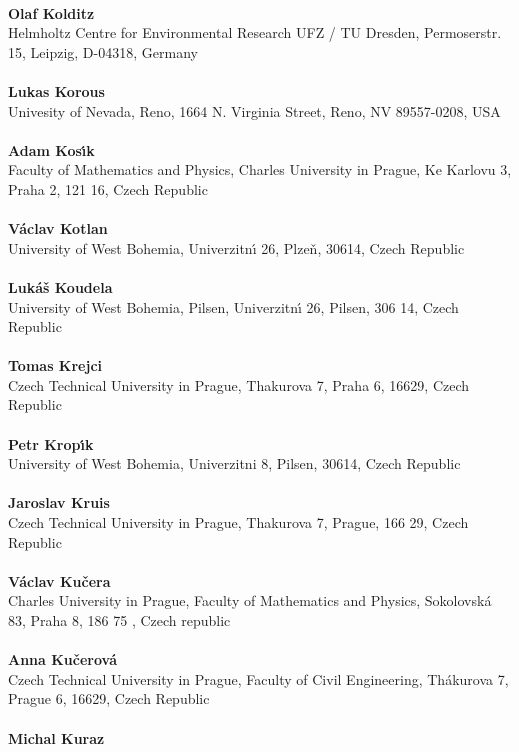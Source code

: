 \\ 
\textbf{Olaf Kolditz}
\\ 
Helmholtz Centre for Environmental Research UFZ / TU Dresden, Permoserstr. 15, Leipzig, D-04318, Germany\\ 
\\ 
\textbf{Lukas Korous}
\\ 
Univesity of Nevada, Reno, 1664 N. Virginia Street, Reno, NV 89557-0208, USA\\ 
\\ 
\textbf{Adam Kos\'{\i}k}
\\ 
Faculty of Mathematics and Physics, Charles University in Prague, Ke Karlovu 3, Praha 2, 121 16, Czech Republic\\ 
\\ 
\textbf{V\'aclav Kotlan}
\\ 
University of West Bohemia, Univerzitn\'{\i} 26, Plze\v{n}, 30614, Czech Republic\\ 
\\ 
\textbf{Luk\'aš Koudela}
\\ 
University of West Bohemia, Pilsen, Univerzitn\'{\i} 26, Pilsen, 306 14, Czech Republic\\ 
\\ 
\textbf{Tomas Krejci}
\\ 
Czech Technical University in Prague, Thakurova 7, Praha 6, 16629, Czech Republic\\ 
\\ 
\textbf{Petr Krop\'{\i}k}
\\ 
University of West Bohemia, Univerzitni 8, Pilsen, 30614, Czech Republic\\ 
\\ 
\textbf{Jaroslav Kruis}
\\ 
Czech Technical University in Prague, Thakurova 7, Prague, 166 29, Czech Republic\\ 
\\ 
\textbf{V\'aclav Ku\v{c}era}
\\ 
Charles University in Prague, Faculty of Mathematics and Physics, Sokolovsk\'a 83, Praha 8, 186 75 , Czech republic\\ 
\\ 
\textbf{Anna Ku\v{c}erov\'a}
\\ 
Czech Technical University in Prague, Faculty of Civil Engineering, Th\'akurova 7, Prague 6, 16629, Czech Republic\\ 
\\ 
\textbf{Michal Kuraz}
\\ 
